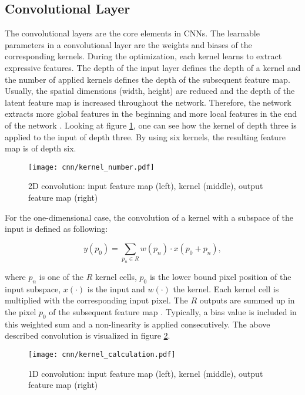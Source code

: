 \subsection{Convolutional Layer}
The convolutional layers are the core elements in CNNs. The learnable parameters in a convolutional layer are the weights and biases of the corresponding kernels. During the optimization, each kernel learns to extract expressive features. The depth of the input layer defines the depth of a kernel and the number of applied kernels defines the depth of the subsequent feature map. Usually, the spatial dimensions (width, height) are reduced and the depth of the latent feature map is increased throughout the network. Therefore, the network extracts more global features in the beginning and more local features in the end of the network \cite{OShea2015}. Looking at figure \ref{fig:kernel_number}, one can see how the kernel of depth three is applied to the input of depth three. By using six kernels, the resulting feature map is of depth six.

\begin{figure}[H]
  \centering
  \texttt{[image: cnn/kernel\_number.pdf]}
  \caption {2D convolution: input feature map (left), kernel (middle), output feature map (right)}
  \label{fig:kernel_number}
\end{figure}

For the one-dimensional case, the convolution of a kernel with a subspace of the input is defined as following:

\begin{equation}
  y(p_{0}) = \sum_{p_{n} \in R} w(p_{n}) \cdot x(p_{0} + p_{n}), 
  \label{eq:kernel}
\end{equation}

where $p_{n}$ is one of the $R$ kernel cells, $p_{0}$ is the lower bound pixel position of the input subspace, $x(\cdot)$ is the input and $w(\cdot)$ the kernel. Each kernel cell is multiplied with the corresponding input pixel. The $R$ outputs are summed up in the pixel $p_{0}$ of the subsequent feature map \cite{Dai2017}. Typically, a bias value is included in this weighted sum and a non-linearity is applied consecutively. The above described convolution is visualized in figure \ref{fig:kernel}.

\begin{figure}[H]
  \centering
  \texttt{[image: cnn/kernel\_calculation.pdf]}
  \caption {1D convolution: input feature map (left), kernel (middle), output feature map (right)}
  \label{fig:kernel}
\end{figure}

